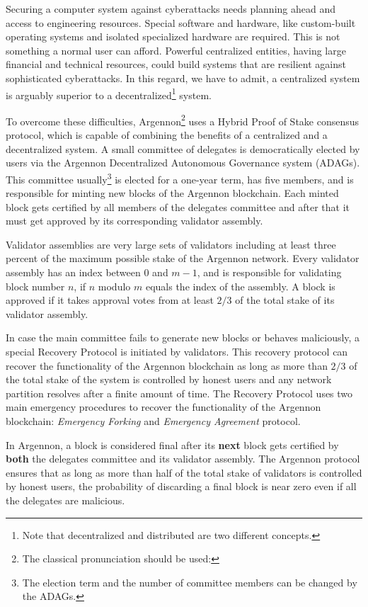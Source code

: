 Securing a computer system against cyberattacks needs planning ahead and access to engineering resources.
Special software and hardware, like custom-built operating systems and isolated specialized hardware are required.
This is not something a normal user can afford. Powerful centralized entities, having large financial and
technical resources, could build
systems that are resilient against sophisticated cyberattacks. In this regard, we have to admit, a centralized system is
arguably superior to a decentralized\footnote{Note that decentralized and distributed are two different concepts.}
system.

To overcome these difficulties, Argennon\footnote{The classical pronunciation should be used:}
uses a Hybrid Proof of Stake consensus protocol, which is
capable of combining the benefits of a centralized and a decentralized system. A small committee of
delegates is democratically elected by users via the Argennon Decentralized Autonomous Governance system
(ADAGs). This committee usually\footnote{The election term and the number of committee members can be changed by the
ADAGs.} is elected for a one-year term, has five members, and is responsible for minting new
blocks of the Argennon blockchain.
Each minted block gets certified by all members of the delegates committee and after that it must get approved
by its corresponding validator assembly.

Validator assemblies are very
large sets of validators including at least three percent of the maximum possible stake of the Argennon network.
Every validator assembly has an index between $0$ and $m - 1$, and is responsible for validating block number $n$,
if $n$ modulo $m$ equals the index of the assembly. A block is approved if it takes approval votes from at
least $2/3$ of the total stake of its validator assembly.

In case the main committee fails to generate new blocks or behaves maliciously, a special Recovery Protocol is
initiated by validators.
This recovery protocol can recover the functionality
of the Argennon blockchain as long as more than $2/3$ of the total stake of the system is controlled by honest users
and any network partition resolves after a finite amount of time. The Recovery Protocol uses two main emergency
procedures to recover the functionality of the Argennon blockchain: \emph{Emergency Forking} and \emph{Emergency
Agreement} protocol.

In Argennon, a block is considered final after its \textbf{next} block gets certified by \textbf{both} the
delegates committee and its validator assembly.
The Argennon protocol ensures that as long as more than half of the total stake of validators is
controlled by honest users, the probability of discarding a final block is near zero even if all the delegates are
malicious.

